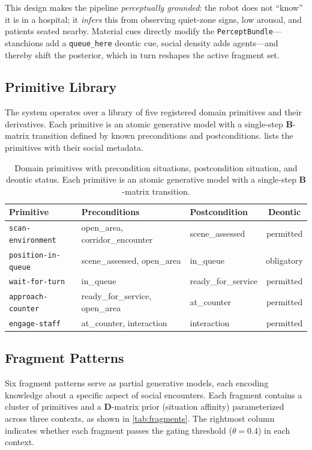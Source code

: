 \documentclass[11pt,a4paper]{article}
\newcommand{\B}{\mathbf{B}}
\newcommand{\D}{\mathbf{D}}
\begin{document}
This design makes the pipeline \emph{perceptually grounded}: the robot does not ``know'' it is in a hospital; it \emph{infers} this from observing quiet-zone signs, low arousal, and patients seated nearby.  Material cues directly modify the \texttt{PerceptBundle}---stanchions add a \texttt{queue\_here} deontic cue, social density adds agents---and thereby shift the posterior, which in turn reshapes the active fragment set.

\subsection{Primitive Library}

The system operates over a library of five registered domain primitives and their derivatives.  Each primitive is an atomic generative model with a single-step $\B$-matrix transition defined by known preconditions and postconditions.   lists the primitives with their social metadata.

\begin{table}[H]
\centering
\small
\begin{tabular}{lllc}
\toprule
Primitive & Preconditions & Postcondition & Deontic \\
\midrule
\texttt{scan-environment} & open\_area, corridor\_encounter & scene\_assessed & permitted \\
\texttt{position-in-queue} & scene\_assessed, open\_area & in\_queue & obligatory \\
\texttt{wait-for-turn} & in\_queue & ready\_for\_service & permitted \\
\texttt{approach-counter} & ready\_for\_service, open\_area & at\_counter & permitted \\
\texttt{engage-staff} & at\_counter, interaction & interaction & permitted \\
\bottomrule
\end{tabular}
\caption{Domain primitives with precondition situations, postcondition situation, and deontic status.  Each primitive is an atomic generative model with a single-step $\B$-matrix transition.}
\label{tab:primitives}
\end{table}

\subsection{Fragment Patterns}

Six fragment patterns serve as partial generative models, each encoding knowledge about a specific aspect of social encounters.  Each fragment contains a cluster of primitives and a $\D$-matrix prior (situation affinity) parameterized across three contexts, as shown in \cref{tab:fragments}.  The rightmost column indicates whether each fragment passes the gating threshold ($\theta = 0.4$) in each context.
\end{document}
